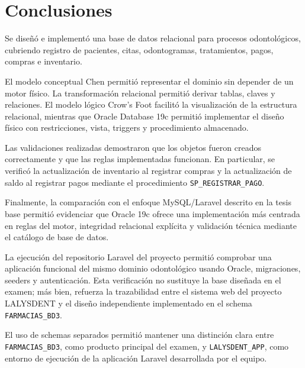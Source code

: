 \section{Conclusiones}

Se diseñó e implementó una base de datos relacional para procesos odontológicos, cubriendo registro de pacientes, citas, odontogramas, tratamientos, pagos, compras e inventario.

El modelo conceptual Chen permitió representar el dominio sin depender de un motor físico. La transformación relacional permitió derivar tablas, claves y relaciones. El modelo lógico Crow's Foot facilitó la visualización de la estructura relacional, mientras que Oracle Database 19c permitió implementar el diseño físico con restricciones, vista, triggers y procedimiento almacenado.

Las validaciones realizadas demostraron que los objetos fueron creados correctamente y que las reglas implementadas funcionan. En particular, se verificó la actualización de inventario al registrar compras y la actualización de saldo al registrar pagos mediante el procedimiento \texttt{SP\_REGISTRAR\_PAGO}.

Finalmente, la comparación con el enfoque MySQL/Laravel descrito en la tesis base permitió evidenciar que Oracle 19c ofrece una implementación más centrada en reglas del motor, integridad relacional explícita y validación técnica mediante el catálogo de base de datos.


La ejecución del repositorio Laravel del proyecto permitió comprobar una aplicación funcional del mismo dominio odontológico usando Oracle, migraciones, seeders y autenticación. Esta verificación no sustituye la base diseñada en el examen; más bien, refuerza la trazabilidad entre el sistema web del proyecto LALYSDENT y el diseño independiente implementado en el schema \texttt{FARMACIAS\_BD3}.

El uso de schemas separados permitió mantener una distinción clara entre \texttt{FARMACIAS\_BD3}, como producto principal del examen, y \texttt{LALYSDENT\_APP}, como entorno de ejecución de la aplicación Laravel desarrollada por el equipo.
